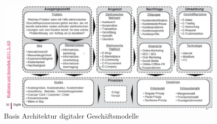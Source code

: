 \documentclass[../Main.tex]{subfiles}
\begin{document}
\begin{figure}[H]
    \centering
    \includegraphics[width=1\linewidth]{Images/digbus/digmodarch.png}
    \caption{Basis Architektur digitaler Geschäftsmodelle}
\end{figure}
\end{document}
